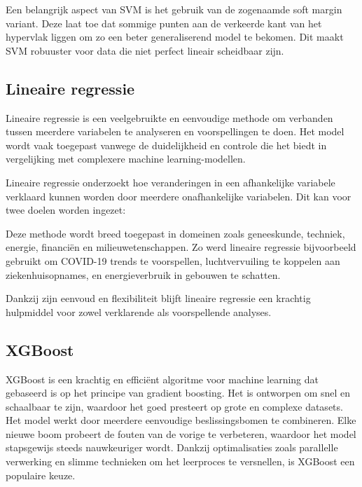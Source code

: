 \vspace{1em}

Een belangrijk aspect van SVM is het gebruik van de zogenaamde soft margin variant. Deze laat toe dat sommige punten aan de verkeerde kant van het hypervlak liggen om zo een beter generaliserend model te bekomen. Dit maakt SVM robuuster voor data die niet perfect lineair scheidbaar zijn.

\subsection*{Lineaire regressie}

Lineaire regressie is een veelgebruikte en eenvoudige methode om verbanden tussen meerdere variabelen te analyseren en voorspellingen te doen. Het model wordt vaak toegepast vanwege de duidelijkheid en controle die het biedt in vergelijking met complexere machine learning-modellen.\autocite{Etemadi2021}
\vspace{1em}

Lineaire regressie onderzoekt hoe veranderingen in een afhankelijke variabele verklaard kunnen worden door meerdere onafhankelijke variabelen. Dit kan voor twee doelen worden ingezet:


Deze methode wordt breed toegepast in domeinen zoals geneeskunde, techniek, energie, financiën en milieuwetenschappen. Zo werd lineaire regressie bijvoorbeeld gebruikt om COVID-19 trends te voorspellen, luchtvervuiling te koppelen aan ziekenhuisopnames, en energieverbruik in gebouwen te schatten.

\vspace{1em}

Dankzij zijn eenvoud en flexibiliteit blijft lineaire regressie een krachtig hulpmiddel voor zowel verklarende als voorspellende analyses.


\subsection*{XGBoost}

XGBoost is een krachtig en efficiënt algoritme voor machine learning dat gebaseerd is op het principe van gradient boosting. Het is ontworpen om snel en schaalbaar te zijn, waardoor het goed presteert op grote en complexe datasets. Het model werkt door meerdere eenvoudige beslissingsbomen te combineren. Elke nieuwe boom probeert de fouten van de vorige te verbeteren, waardoor het model stapsgewijs steeds nauwkeuriger wordt. Dankzij optimalisaties zoals parallelle verwerking en slimme technieken om het leerproces te versnellen, is XGBoost een populaire keuze.\autocite{Hakkal2024}

